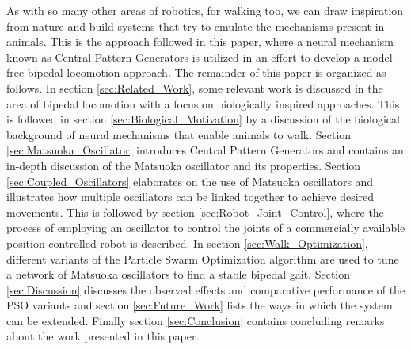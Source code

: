 \documentclass[12pt,twoside]{article}
\theoremstyle{plain}
\theoremstyle{definition}
\theoremstyle{remark}
\newcommand{\forceindent}{\leavevmode{\parindent=2em\indent}}
\begin{document}
\forceindent As with so many other areas of robotics, for walking too, we can draw inspiration from nature and build systems that try to emulate the mechanisms present in animals. This is the approach followed in this paper, where a neural mechanism known as Central Pattern Generators is utilized in an effort to develop a model-free bipedal locomotion approach. The remainder of this paper is organized as follows. In section \ref{sec:Related_Work}, some relevant work is discussed in the area of bipedal locomotion with a focus on biologically inspired approaches. This is followed in section \ref{sec:Biological_Motivation} by a discussion of the biological background of neural mechanisms that enable animals to walk. Section \ref{sec:Matsuoka_Oscillator} introduces Central Pattern Generators and contains an in-depth discussion of the Matsuoka oscillator and its properties. Section \ref{sec:Coupled_Oscillators} elaborates on the use of Matsuoka oscillators and illustrates how multiple oscillators can be linked together to achieve desired movements. This is followed by section \ref{sec:Robot_Joint_Control}, where the process of employing an oscillator to control the joints of a commercially available position controlled robot is described. In section \ref{sec:Walk_Optimization}, different variants of the Particle Swarm Optimization algorithm are used to tune a network of Matsuoka oscillators to find a stable bipedal gait. Section \ref{sec:Discussion} discusses the observed effects and comparative performance of the PSO variants and section \ref{sec:Future_Work} lists the ways in which the system can be extended. Finally section \ref{sec:Conclusion} contains concluding remarks about the work presented in this paper.
\end{document}
